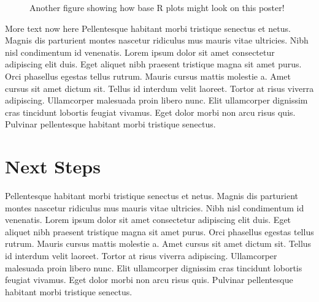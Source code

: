 \documentclass[article,30pt,extrafontsizes]{memoir}
\begin{document}
\begin{adjmulticols*}{3}{10mm}{10mm}
{\begin{figure}
{}

\caption{Another figure showing how base R plots might look on this poster!}\label{fig:unnamed-chunk-7}
\end{figure}

More text now here Pellentesque habitant morbi tristique senectus et
netus. Magnis dis parturient montes nascetur ridiculus mus mauris vitae
ultricies. Nibh nisl condimentum id venenatis. Lorem ipsum dolor sit
amet consectetur adipiscing elit duis. Eget aliquet nibh praesent
tristique magna sit amet purus. Orci phasellus egestas tellus rutrum.
Mauris cursus mattis molestie a. Amet cursus sit amet dictum sit. Tellus
id interdum velit laoreet. Tortor at risus viverra adipiscing.
Ullamcorper malesuada proin libero nunc. Elit ullamcorper dignissim cras
tincidunt lobortis feugiat vivamus. Eget dolor morbi non arcu risus
quis. Pulvinar pellentesque habitant morbi tristique senectus.

\section{Next Steps}\label{next-steps}

Pellentesque habitant morbi tristique senectus et netus. Magnis dis
parturient montes nascetur ridiculus mus mauris vitae ultricies. Nibh
nisl condimentum id venenatis. Lorem ipsum dolor sit amet consectetur
adipiscing elit duis. Eget aliquet nibh praesent tristique magna sit
amet purus. Orci phasellus egestas tellus rutrum. Mauris cursus mattis
molestie a. Amet cursus sit amet dictum sit. Tellus id interdum velit
laoreet. Tortor at risus viverra adipiscing. Ullamcorper malesuada proin
libero nunc. Elit ullamcorper dignissim cras tincidunt lobortis feugiat
vivamus. Eget dolor morbi non arcu risus quis. Pulvinar pellentesque
habitant morbi tristique senectus.
\printbibliography
}
\end{adjmulticols*}
\end{document}
